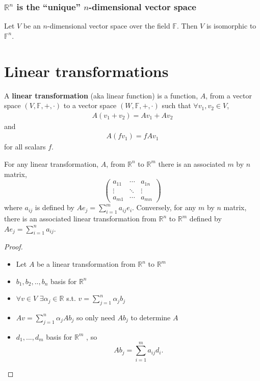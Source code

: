 \documentclass[compress]{beamer}
\def\F{\mathbb{F}}
\def\R{\mathbb{R}}
\newcommand{\gmatrix}[1]{\begin{pmatrix} {#1}_{11} & \cdots &
    {#1}_{1n} \\ \vdots & \ddots & \vdots \\ {#1}_{m1} & \cdots &
    {#1}_{mn} \end{pmatrix}}
\theoremstyle{definition}
\begin{document}
\begin{frame}\frametitle{$\R^n$ is the ``unique'' $n$-dimensional
    vector space}
  \begin{theorem}
    Let $V$ be an $n$-dimensional vector space over the field $\F$. Then
    $V$ is isomorphic to $\F^n$. 
  \end{theorem}
\end{frame}

\section{Linear transformations}

\begin{frame}
  \begin{definition}
    A \textbf{linear transformation} (aka linear function) is a
    function, $A$, from a vector space $(V,\F,+,\cdot)$ to a vector
    space $(W,\F,+,\cdot)$ such that $\forall v_1, v_2 \in V$,
    \begin{align*}
      A (v_1 + v_2) = A v_1 + A v_2 
    \end{align*}
    and 
    \begin{align*}
      A (f v_1) = f A v_1
    \end{align*}
    for all scalars $f$.   
  \end{definition}
\end{frame}

\begin{frame}
  \begin{theorem}
    For any linear transformation, $A$, from $\R^n$ to $\R^m$ there is an
    associated $m$ by $n$ matrix,
    \[ 
    \gmatrix{a}
    \]
    where $a_{ij}$ is defined by $A e_j = \sum_{i=1}^m a_{ij}
    e_i$. Conversely, for any $m$ by $n$ matrix, there is an associated
    linear transformation from $\R^n$ to $\R^m$ defined by $A e_j =
    \sum_{i=1}^n a_{ij}$.
  \end{theorem}
\end{frame}

\begin{frame}
  \begin{proof}
    \begin{itemize} 
    \item Let $A$ be a linear transformation from $\R^n$ to
      $\R^m$
    \item $b_1, b_2, .., b_n$ basis for $\R^n$
    \item $\forall v \in V$ $\exists \alpha_j\in \R$ s.t. $v = \sum_{j=1}^n
      \alpha_j b_j$ 
    \item $A v = \sum_{j=1}^n \alpha_j A b_j$ so only need $A b_j$ to
      determine $A$
    \item $d_1, ..., d_m $ basis for $\R^m$ , so 
      \[
      A b_j = \sum_{i=1}^m a_{ij} d_i.
      \]
    \end{itemize}
  \end{proof}
\end{frame}
\end{document}
